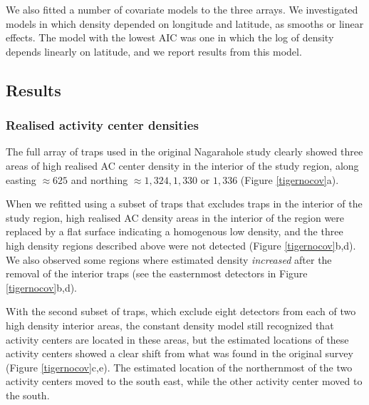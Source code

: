 \documentclass[10pt,a4paper]{article}
\begin{document}
We also fitted a number of covariate models to the three arrays. We investigated models in which density depended on longitude and latitude, as smooths or linear effects. The model with the lowest AIC was one in which the log of density depends linearly on latitude, and we report results from this model. 

\subsection{Results} 

\subsubsection{Realised activity center densities}

The full array of traps used in the original Nagarahole study clearly showed three areas of high realised AC center density in the interior of the study region, along easting $\approx 625$ and northing $\approx 1,324, 1,330$ or $1,336$ (Figure \ref{tigernocov}a). 

When we refitted using a subset of traps that excludes traps in the interior of the study region, high realised AC density areas in the interior of the region were replaced by a flat surface indicating a homogenous low density, and the three high density regions described above were not detected  (Figure \ref{tigernocov}b,d). We also observed some regions where estimated density {\it increased} after the removal of the interior traps (see the easternmost detectors in Figure \ref{tigernocov}b,d). %

With the second subset of traps, which exclude eight detectors from each of two high density interior areas, the constant density model still recognized that activity centers are located in these areas, but the estimated locations of these activity centers showed a clear shift from what was found in the original survey (Figure \ref{tigernocov}c,e). The estimated location of the northernmost of the two activity centers moved to the south east, while the other activity center moved to the south.
\end{document}
